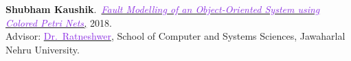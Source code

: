 \textbf{Shubham Kaushik}.\ \href{https://doi.org/10.26438/ijcse/v7i5.18281845}
{\textit{\textcolor{blueviolet}{Fault Modelling of an Object-Oriented System using Colored Petri Nets},}} 2018.\\
Advisor:
\href{https://www.jnu.ac.in/content/ratnesh}{\textcolor{blueviolet}{Dr.\
		Ratneshwer}}, School of Computer and Systems Sciences, Jawaharlal Nehru
University.


